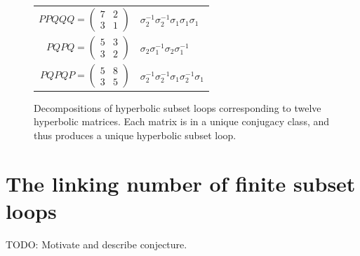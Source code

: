 \documentclass[12pt,twoside]{reedthesis}
\theoremstyle{definition}
\newcommand{\TODO}[1]{{\color{todopink}\textsf{TODO: #1}}}
\begin{document}
\begin{figure}[p]
\begin{tabular}{r l}
   $PPQQQ = \begin{pmatrix}7 & 2 \\ 3 & 1\end{pmatrix}$ & $\sigma_2^{-1} \sigma_2^{-1} \sigma_1 \sigma_1 \sigma_1$ \\[1em]
   $PQPQ = \begin{pmatrix}5 & 3 \\ 3 & 2\end{pmatrix}$ & $\sigma_2 \sigma_1^{-1} \sigma_2 \sigma_1^{-1}$ \\[1em]
   $PQPQP = \begin{pmatrix}5 & 8 \\ 3 & 5\end{pmatrix}$ & $\sigma_2^{-1} \sigma_2^{-1} \sigma_1 \sigma_2^{-1} \sigma_1$
  \end{tabular}
  \caption{Decompositions of hyperbolic subset loops corresponding to twelve hyperbolic matrices. Each matrix is in a unique conjugacy class, and thus produces a unique hyperbolic subset loop.}
  \label{fig:subset_loop_decompositions_table}
\end{figure}


\section{The linking number of finite subset loops}

\TODO{Motivate and describe conjecture.}

\newpage
\appendix

\end{document}
